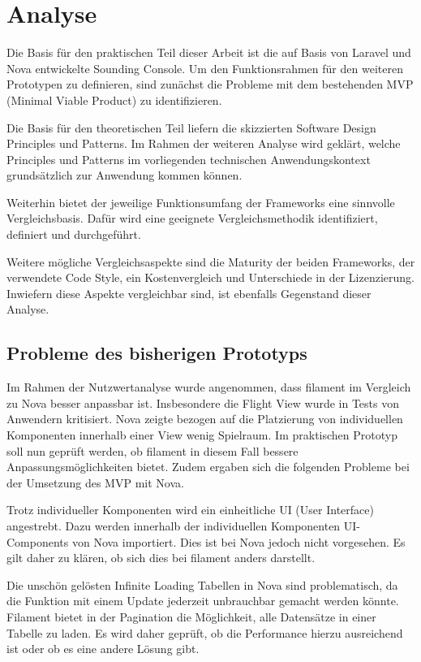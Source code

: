 \section{Analyse}
Die Basis für den praktischen Teil dieser Arbeit ist die auf Basis von Laravel und Nova entwickelte Sounding Console.
Um den Funktionsrahmen für den weiteren Prototypen zu definieren, sind zunächst die Probleme mit dem bestehenden MVP (Minimal Viable Product) zu identifizieren.

Die Basis für den theoretischen Teil liefern die skizzierten Software Design Principles und Patterns.
Im Rahmen der weiteren Analyse wird geklärt, welche Principles und Patterns im vorliegenden technischen Anwendungskontext grundsätzlich zur Anwendung kommen können.

Weiterhin bietet der jeweilige Funktionsumfang der Frameworks eine sinnvolle Vergleichsbasis.
Dafür wird eine geeignete Vergleichsmethodik identifiziert, definiert und durchgeführt.

Weitere mögliche Vergleichsaspekte sind die Maturity der beiden Frameworks, der verwendete Code Style, ein Kostenvergleich und Unterschiede in der Lizenzierung.
Inwiefern diese Aspekte vergleichbar sind, ist ebenfalls Gegenstand dieser Analyse.

\subsection{Probleme des bisherigen Prototyps}
Im Rahmen der Nutzwertanalyse wurde angenommen, dass filament im Vergleich zu Nova besser anpassbar ist.
Insbesondere die Flight View wurde in Tests von Anwendern kritisiert.
Nova zeigte bezogen auf die Platzierung von individuellen Komponenten innerhalb einer View wenig Spielraum.
Im praktischen Prototyp soll nun geprüft werden, ob filament in diesem Fall bessere Anpassungsmöglichkeiten bietet.
Zudem ergaben sich die folgenden Probleme bei der Umsetzung des MVP mit Nova.

Trotz individueller Komponenten wird ein einheitliche UI (User Interface) angestrebt.
Dazu werden innerhalb der individuellen Komponenten UI-Components von Nova importiert.
Dies ist bei Nova jedoch nicht vorgesehen.
Es gilt daher zu klären, ob sich dies bei filament anders darstellt.

Die unschön gelösten Infinite Loading Tabellen in Nova sind problematisch, da die Funktion mit einem Update jederzeit unbrauchbar gemacht werden könnte.
Filament bietet in der Pagination die Möglichkeit, alle Datensätze in einer Tabelle zu laden.
Es wird daher geprüft, ob die Performance hierzu ausreichend ist oder ob es eine andere Lösung gibt.

